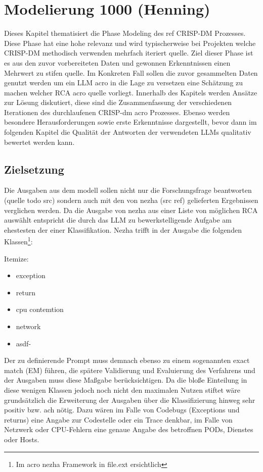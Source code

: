 \chapter{Modelierung 1000 (Henning)}
\label{sec:Kapitel3}

Dieses Kapitel thematisiert die Phase Modeling des ref CRISP-DM Prozesses. Diese Phase hat eine hohe relevanz und wird typischerweise bei Projekten welche CRISP-DM methodisch verwenden mehrfach iteriert quelle. Ziel dieser Phase ist es aus den zuvor vorbereiteten Daten und gewonnen Erkenntnissen einen Mehrwert zu stifen quelle. Im Konkreten Fall sollen die zuvor gesammelten Daten genutzt werden um ein LLM acro in die Lage zu versetzen eine Schätzung zu machen welcher RCA acro quelle vorliegt. Innerhalb des Kapitels werden Ansätze zur Lösung diskutiert, diese sind die Zusammenfassung der verschiedenen Iterationen des durchlaufenen CRISP-dm acro Prozesses. Ebenso werden besondere Herausforderungen sowie erste Erkenntnisse dargestellt, bevor dann im folgenden Kapitel die Qualität der Antworten der verwendeten LLMs qualitativ bewertet werden kann. 

\section{Zielsetzung}
\label{sec:Zielsetzung}

Die Ausgaben aus dem modell sollen nicht nur die Forschungsfrage beantworten (quelle todo src) sondern auch mit den von nezha (src ref) gelieferten Ergebnissen verglichen werden. Da die Ausgabe von nezha aus einer Liste von möglichen RCA auswählt entspricht die durch das LLM zu bewerkstelligende Aufgabe am ehestesten der einer Klassifikation. Nezha trifft in der Ausgabe die folgenden Klassen\footnote{Im acro nezha Framework in file.ext ersichtlich}:

Itemize:
\begin{itemize}
\item exception
\item return
\item cpu contemtion
\item network
\item asdf-
\end{itemize}

Der zu definierende Prompt muss demnach ebenso zu einem sogenannten exact match (EM) führen, die spätere Validierung und Evaluierung des Verfahrens und der Ausgaben muss diese Maßgabe berücksichtigen. Da die bloße Einteilung in diese wenigen Klassen jedoch noch nicht den maximalen Nutzen stiftet wäre grundsätzlich die Erweiterung der Ausgaben über die Klassifizierung hinweg sehr positiv bzw. ach nötig. Dazu wären im Falle von Codebugs (Exceptions und returns) eine Angabe zur Codestelle oder ein Trace denkbar, im Falle von Netzwerk oder CPU-Fehlern eine genaue Angabe des betroffnen PODs, Dienstes oder Hosts.

